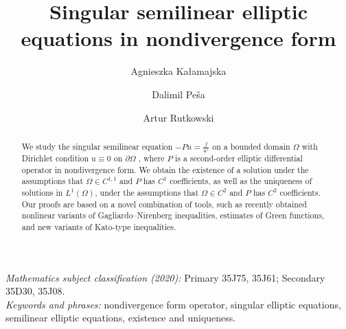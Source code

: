 \documentclass[12pt,a4paper]{amsart}
\title{Singular semilinear elliptic equations in nondivergence form}
\author{Agnieszka Ka{\l}amajska}
\author{Dalimil Pe\v{s}a}
\author{Artur Rutkowski}
\theoremstyle{definition}
\begin{document}
\linespread{1.3}

\maketitle




\begin{flushleft}
\textit{Mathematics subject classification (2020):} Primary 35J75, 35J61; Secondary 35D30, 35J08.\\

\textit{Keywords and phrases:} nondivergence form operator, singular elliptic equations, semilinear elliptic equations, existence and uniqueness.
\end{flushleft}
\begin{abstract}
   We study the singular semilinear equation $-Pu = \frac{f}{u^\gamma}$ on a bounded domain $\Omega$ with Dirichlet condition $u \equiv 0$ on $\partial \Omega$ , where $P$ is a second-order elliptic differential operator in nondivergence form. We obtain the existence of a solution under the assumptions that $\Omega \in C^{1,1}$ and $P$ has $C^1$ coefficients, as well as the uniqueness of solutions in $L^1(\Omega)$, under the assumptions that $\Omega \in C^2$ and $P$ has $C^2$ coefficients. Our proofs are based on a novel combination of tools, such as recently obtained nonlinear variants of Gagliardo--Nirenberg inequalities, estimates of Green functions, and new variants of Kato-type inequalities.
\end{abstract}
\end{document}
